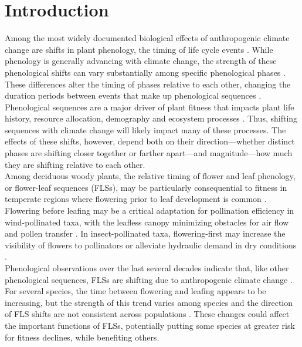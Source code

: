\documentclass[11pt]{article}\usepackage[]{graphicx}\usepackage[]{color}
\begin{document}
\section*{Introduction}
\noindent Among the most widely documented biological effects of anthropogenic climate change are shifts in plant phenology, the timing of life cycle events \citep{Parmesan2003,Menzel2006,Cleland2007}. While phenology is generally advancing with climate change, the strength of these phenological shifts can vary substantially among specific phenological phases \citep{Augspurger:2020aa}. These differences alter the timing of phases relative to each other, changing the duration periods between events that make up phenological sequences \citep{Ettinger2018}. Phenological sequences are a major driver of plant fitness that impacts plant life history, resource allocation, demography and ecosystem processes \citep{Post:2008aa}. Thus, shifting sequences with climate change will likely impact many of these processes. The effects of these shifts, however, depend both on their direction---whether distinct phases are shifting closer together or farther apart---and magnitude---how much they are shifting relative to each other.\\ 

\noindent Among deciduous woody plants, the relative timing of flower and leaf phenology, or flower-leaf sequences (FLSs), may be particularly consequential to fitness in temperate regions where flowering prior to leaf development is common \citep{Rathcke_1985,Gougherty2018}. Flowering before leafing may be a critical adaptation for pollination efficiency in wind-pollinated taxa, with the leafless canopy minimizing obstacles for air flow and pollen transfer \citep{Whitehead1969}. In insect-pollinated taxa, flowering-first may increase the visibility of flowers to pollinators \citep{Janzen1967,Savage2019} or alleviate hydraulic demand in dry conditions \citep{Gougherty2018, Franklin2016}.\\

\noindent Phenological observations over the last several decades indicate that, like other phenological sequences, FLSs are shifting due to anthropogenic climate change \citep{Buonaiuto2020}. For several species, the time between flowering and leafing appears to be increasing, but the strength of this trend varies among species and the direction of FLS shifts are not consistent across populations \citep{Buonaiuto2020}. These changes could affect the important functions of FLSs, potentially putting some species at greater risk for fitness declines, while benefiting others.\\
\end{document}
